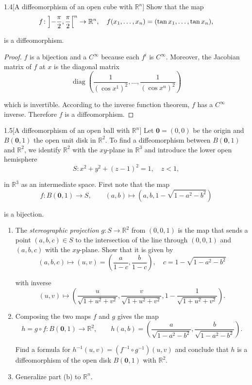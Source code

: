 \begin{problem}{1.4}[A diffeomorphism of an open cube with \(\mathbb{R}^{n}\)]
Show that the map
\[
    f\colon{\left\rbrack{-\frac{\pi}{2},\frac{\pi}{2}}\right\lbrack}^{n}\to\mathbb{R}^{n}, \quad f(x_{1},\ldots,x_{n})=(\tan x_{1},\ldots,\tan x_{n}),
\]

is a diffeomorphism.
\end{problem}

\begin{proof}
    \( f \) is a bijection and a \( C^{\infty} \) because each \( f^{i} \) is \( C^{\infty} \). Moreover, the Jacobian matrix of \( f \) at \( x \) is the diagonal matrix
    \[
        \operatorname{diag}\left(\frac{1}{{(\cos x^{1})}^{2}}, \ldots, \frac{1}{{(\cos x^{n})}^{2}}\right)
    \]

    which is invertible. According to the inverse function theorem, \( f \) has a \( C^{\infty} \) inverse. Therefore \( f \) is a diffeomorphism.
\end{proof}

\begin{problem}{1.5}[A diffeomorphism of an open ball with \( \mathbb{R}^{n} \)]
Let \( \mathbf{0} = (0, 0) \) be the origin and \( B(\mathbf{0}, 1) \) the open unit disk in \( \mathbb{R}^{2} \). To find a diffeomorphism between \( B(\mathbf{0}, 1) \) and \( \mathbb{R}^{2} \), we identify \( \mathbb{R}^{2} \) with the \( xy \)-plane in \( \mathbb{R}^{3} \) and introduce the lower open hemisphere
\[
    S: x^{2} + y^{2} + {(z - 1)}^{2} = 1, \quad z < 1,
\]

in \( \mathbb{R}^{3} \) as an intermediate space. First note that the map
\[
    f: B(\mathbf{0}, 1) \to S, \qquad (a, b) \mapsto (a, b, 1 - \sqrt{1 - a^{2} - b^{2}})
\]

is a bijection.
\begin{enumerate}[label={(\alph*)}]
    \item The \textit{stereographic projection} \( g: S \to \mathbb{R}^{2} \) from \( (0, 0, 1) \) is the map that sends a point \( (a, b, c) \in S \) to the intersection of the line through \( (0, 0, 1) \) and \( (a, b, c) \) with the \( xy \)-plane. Show that it is given by
          \[
              (a, b, c) \mapsto (u, v) = \left(\frac{a}{1-c}, \frac{b}{1-c}\right), \quad c = 1 - \sqrt{1 - a^{2} - b^{2}}
          \]

          with inverse
          \[
              (u, v) \mapsto \left(\frac{u}{\sqrt{1 + u^{2} + v^{2}}}, \frac{v}{\sqrt{1 + u^{2} + v^{2}}}, 1 - \frac{1}{\sqrt{1 + u^{2} + v^{2}}}\right).
          \]
    \item Composing the two maps \( f \) and \( g \) gives the map
          \[
              h = g\circ f: B(\mathbf{0}, 1) \to \mathbb{R}^{2},\qquad h(a, b) = \left(\frac{a}{\sqrt{1 - a^{2} - b^{2}}}, \frac{b}{\sqrt{1 - a^{2} - b^{2}}}\right).
          \]

          Find a formula for \( h^{-1}(u, v) = {(f^{-1} \circ g^{-1})}(u, v) \) and conclude that \( h \) is a diffeomorphism of the open disk \( B(\mathbf{0}, 1) \) with \( \mathbb{R}^{2} \).
    \item Generalize part (b) to \( \mathbb{R}^{n} \).
\end{enumerate}
\end{problem}

